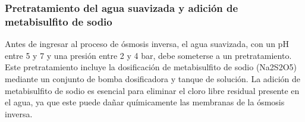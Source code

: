\subsubsection{Pretratamiento del agua suavizada y adición de metabisulfito de sodio}

Antes de ingresar al proceso de ósmosis inversa, el agua suavizada, con un pH entre 5 y 7 y una presión entre 2 y 4 bar, debe someterse a un pretratamiento. Este pretratamiento incluye la dosificación de metabisulfito de sodio (Na2S2O5) mediante un conjunto de bomba dosificadora y tanque de solución. La adición de metabisulfito de sodio es esencial para eliminar el cloro libre residual presente en el agua, ya que este puede dañar químicamente las membranas de la ósmosis inversa.\\